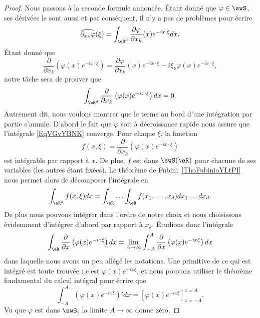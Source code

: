 \begin{proof}
	Nous passons à la seconde formule annoncée. Étant donné que \( \varphi\in\swS\), ses dérivées le sont aussi et par conséquent, il n'y a pas de problèmes pour écrire
	\begin{equation}    \label{EqTYizlnia}
		\widehat{\partial_{x_k}\varphi}(\xi)=\int_{\eR^d}\frac{ \partial \varphi }{ \partial x_k }(x) e^{-ix\cdot \xi}dx.
	\end{equation}
	Étant donné que
	\begin{equation}    \label{EqZAeYaCB}
		\frac{ \partial  }{ \partial x_k }\left( \varphi(x) e^{-ix\cdot\xi} \right)=\frac{ \partial \varphi }{ \partial x_k }(x) e^{-ix\cdot\xi}-i\xi_k\varphi(x) e^{-ix\cdot \xi},
	\end{equation}
	notre tâche sera de prouver que
	\begin{equation}    \label{EqVGvYBNK}
		\int_{\eR^d}\frac{ \partial  }{ \partial x_k }\left( \varphi(x) e^{-ix\cdot \xi} \right)dx=0.
	\end{equation}
	Autrement dit, nous voulons montrer que le terme au bord d'une intégration par partie s'annule. D'abord le fait que \( \varphi\) soit à décroissance rapide nous assure que l'intégrale \eqref{EqVGvYBNK} converge. Pour chaque \( \xi\), la fonction
	\begin{equation}
		f(x,\xi)=\frac{ \partial}{\partial x_k }\left( \varphi(x) e^{-ix\cdot \xi} \right)
	\end{equation}
	est intégrable par rapport à \( x\). De plus, \( f\) est dans \( \swS(\eR)\) pour chacune de ses variables (les autres étant fixées). Le théorème de Fubini~\ref{ThoFubinioYLtPI} nous permet alors de décomposer l'intégrale en
	\begin{equation}
		\int_{\eR^d}f(x,\xi)dx=\int_{\eR}\ldots\int_{\eR} f(x_1,\ldots, x_d)dx_1\ldots dx_d.
	\end{equation}
	De plus nous pouvons intégrer dans l'ordre de notre choix et nous choisissons évidemment d'intégrer d'abord par rapport à \( x_k\).  Étudions donc l'intégrale
	\begin{equation}
		\int_{\eR}\frac{ \partial  }{ \partial x }\left( \varphi(x) e^{-ix\xi} \right)dx=\lim_{A\to\infty}\int_{-A}^A\frac{ \partial  }{ \partial x }\left( \varphi(x) e^{-ix\xi} \right)dx
	\end{equation}
	dans laquelle nous avons un peu allégé les notations. Une primitive de ce qui est intégré est toute trouvée : c'est \( \varphi(x) e^{-ix\xi}\), et nous pouvons utiliser le théorème fondamental du calcul intégral pour écrire que
	\begin{equation}
		\int_{-A}^A\left( \varphi(x) e^{-ix\xi} \right)'dx=\left[ \varphi(x) e^{-ix\xi} \right]_{x=-A}^{x=A}.
	\end{equation}
	Vu que \( \varphi\) est dans \( \swS\), la limite \( A\to\infty\) donne zéro.


\end{proof}
